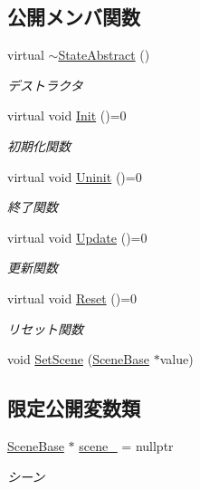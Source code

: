 \subsection*{公開メンバ関数}
\begin{DoxyCompactItemize}
\item 
virtual \mbox{\hyperlink{class_scene_base_1_1_state_abstract_a391d466199d1972bd7512ff5bfb6e328}{$\sim$\+State\+Abstract}} ()
\begin{DoxyCompactList}\small\item\em デストラクタ \end{DoxyCompactList}\item 
virtual void \mbox{\hyperlink{class_scene_base_1_1_state_abstract_a2f5ea12e789aa52df179e6df469b870d}{Init}} ()=0
\begin{DoxyCompactList}\small\item\em 初期化関数 \end{DoxyCompactList}\item 
virtual void \mbox{\hyperlink{class_scene_base_1_1_state_abstract_a7a92fbd3fd68177a4e807bf7c359641c}{Uninit}} ()=0
\begin{DoxyCompactList}\small\item\em 終了関数 \end{DoxyCompactList}\item 
virtual void \mbox{\hyperlink{class_scene_base_1_1_state_abstract_a7fca4c5e7d0174af8a147c404f4e6eee}{Update}} ()=0
\begin{DoxyCompactList}\small\item\em 更新関数 \end{DoxyCompactList}\item 
virtual void \mbox{\hyperlink{class_scene_base_1_1_state_abstract_a7e00d36fa023d91a0f205f12662584a0}{Reset}} ()=0
\begin{DoxyCompactList}\small\item\em リセット関数 \end{DoxyCompactList}\item 
void \mbox{\hyperlink{class_scene_base_1_1_state_abstract_a0d620f6a7f1bd8092cca2ccd7f70c299}{Set\+Scene}} (\mbox{\hyperlink{class_scene_base}{Scene\+Base}} $\ast$value)
\end{DoxyCompactItemize}
\subsection*{限定公開変数類}
\begin{DoxyCompactItemize}
\item 
\mbox{\hyperlink{class_scene_base}{Scene\+Base}} $\ast$ \mbox{\hyperlink{class_scene_base_1_1_state_abstract_a322b66f53e08f55bc91aa2a2b4eded02}{scene\+\_\+}} = nullptr
\begin{DoxyCompactList}\small\item\em シーン \end{DoxyCompactList}\end{DoxyCompactItemize}



